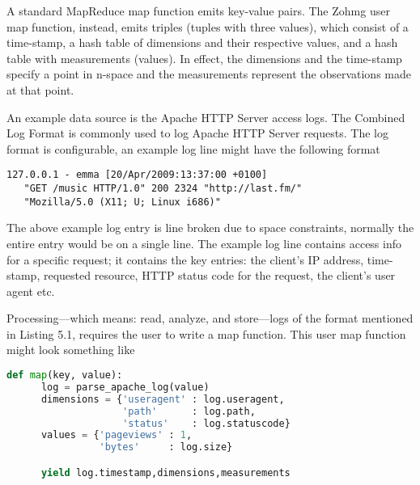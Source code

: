 A standard MapReduce map function emits key-value pairs. The Zohmg user map
function, instead, emits triples (tuples with three values), which consist of a
time-stamp, a hash table of dimensions and their respective values, and a hash
table with measurements (values). In effect, the dimensions and the time-stamp
specify a point in n-space and the measurements represent the observations made
at that point.

An example data source is the Apache HTTP Server access logs. The Combined Log
Format is commonly used to log Apache HTTP Server requests. The log format is
configurable, an example log line might have the following format

\vspace{12pt}

\begin{lstlisting}[caption=Example log line entry for the Apache HTTP Server's
Combined Log Format.,captionpos=b]
   127.0.0.1 - emma [20/Apr/2009:13:37:00 +0100]
   "GET /music HTTP/1.0" 200 2324 "http://last.fm/"
   "Mozilla/5.0 (X11; U; Linux i686)"
\end{lstlisting}

\vspace{12pt}

The above example log entry is line broken due to space constraints, normally
the entire entry would be on a single line. The example log line contains access
info for a specific request; it contains the key entries: the client's IP
address, time-stamp, requested resource, HTTP status code for the request, the
client's user agent etc.

Processing---which means: read, analyze, and store---logs of the format
mentioned in Listing 5.1, requires the user to write a map function. This user
map function might look something like

\vspace{12pt}

\begin{lstlisting}[language=Python,caption={An example map function, parsing
Apache access logs.},captionpos=b]
   def map(key, value):
      log = parse_apache_log(value)
      dimensions = {'useragent' : log.useragent,
                    'path'      : log.path,
                    'status'    : log.statuscode}
      values = {'pageviews' : 1,
                'bytes'     : log.size}

      yield log.timestamp,dimensions,measurements
\end{lstlisting}


